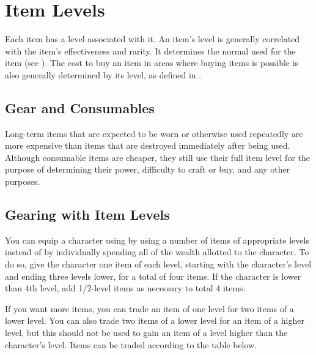 \section{Item Levels}

    Each item has a level associated with it.
    An item's level is generally correlated with the item's effectiveness and rarity.
    It determines the normal  used for the item (see ).
    The cost to buy an item in areas where buying items is possible is also generally determined by its level, as defined in .

    \subsection{Gear and Consumables}
        Long-term items that are expected to be worn or otherwise used repeatedly are more expensive than items that are destroyed immediately after being used.
        Although consumable items are cheaper, they still use their full item level for the purpose of determining their power, difficulty to craft or buy, and any other purposes.

    \subsection{Gearing with Item Levels}

        You can equip a character using by using a number of items of appropriate levels instead of by individually spending all of the wealth allotted to the character. To do so, give the character one item of each level, starting with the character's level and ending three levels lower, for a total of four items. If the character is lower than 4th level, add 1/2-level items as necessary to total 4 items.

        If you want more items, you can trade an item of one level for two items of a lower level.
        You can also trade two items of a lower level for an item of a higher level, but this should not be used to gain an item of a level higher than the character's level.
        Items can be traded according to the table below.

